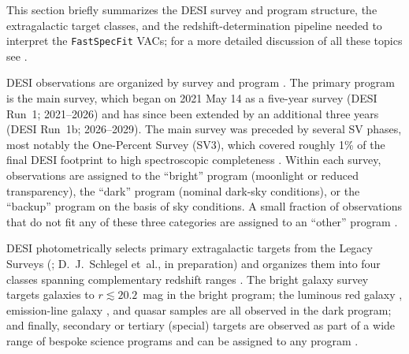 \documentclass[modern,linenumbers]{aastex702}
\newcommand{\fastspecfit}{\texttt{FastSpecFit}}
\begin{document}
This section briefly summarizes the DESI survey and program structure,
the extragalactic target classes, and the redshift-determination
pipeline needed to interpret the \fastspecfit{} VACs; for a more
detailed discussion of all these topics see
\citet{desi-collaboration24e, desi-collaboration24d,
  desi-collaboration26a}.

DESI observations are organized by survey and program
\citep{schlafly23a, myers23a}. The primary program is the main survey,
which began on 2021 May 14 as a five-year survey (DESI Run~1;
2021--2026) and has since been extended by an additional three years
(DESI Run~1b; 2026--2029). The main survey was preceded by several SV
phases, most notably the One-Percent Survey (SV3), which covered
roughly 1\% of the final DESI footprint to high spectroscopic
completeness \citep{desi-collaboration24e,
  desi-collaboration24d}. Within each survey, observations are
assigned to the ``bright'' program (moonlight or reduced
transparency), the ``dark'' program (nominal dark-sky conditions), or
the ``backup'' program \citep[twilight and poor-weather
  time;][]{dey26a} on the basis of sky conditions. A small fraction
of observations that do not fit any of these three categories are
assigned to an ``other'' program \citep{desi-collaboration26a}.

DESI photometrically selects primary extragalactic targets from the
Legacy Surveys (\citealt{dey19a}; D.~J.~Schlegel et~al., in
preparation) and organizes them into four classes spanning
complementary redshift ranges \citep{myers23a}. The bright galaxy
survey \citep[BGS, $0 < z \lesssim 0.6$;][]{hahn23a} targets galaxies
to $r \lesssim 20.2$~mag in the bright program; the luminous red
galaxy \citep[LRG, $0.4 < z \lesssim 1.1$;][]{zhou23a}, emission-line
galaxy \citep[ELG, $0.6 < z \lesssim 1.6$;][]{raichoor23a}, and quasar
\citep[QSO, $0.9 < z \lesssim 4$;][]{chaussidon23a} samples are all
observed in the dark program; and finally, secondary or tertiary
(special) targets are observed as part of a wide range of bespoke
science programs and can be assigned to any program \citep{myers23a,
  desi-collaboration26a}.
\end{document}
